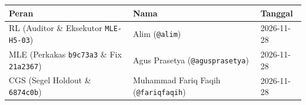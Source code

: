 \documentclass[11pt,a4paper]{article}
\begin{document}
\vspace{6mm}
\begin{tabular}{@{}L{4.5cm}L{5.2cm}L{3.2cm}@{}}
\toprule
Peran & Nama & Tanggal \\
\midrule
RL (Auditor \& Eksekutor \texttt{MLE-H5-03}) & Alim (\texttt{@alim}) & 2026-11-28 \\
MLE (Perkakas \texttt{b9c73a3} \& Fix \texttt{21a2367}) & Agus Prasetya (\texttt{@agusprasetya}) & 2026-11-28 \\
CGS (Segel Holdout \& \texttt{6874c0b}) & Muhammad Fariq Faqih (\texttt{@fariqfaqih}) & 2026-11-28 \\
\bottomrule
\end{tabular}
\end{document}
